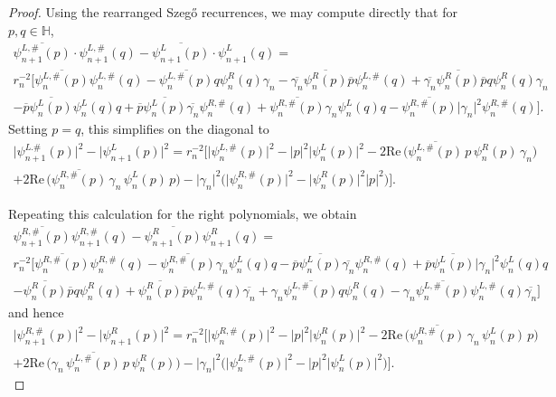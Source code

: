 \documentclass[11pt,reqno]{amsart}
\def\q{\psi}
\def\g{\gamma}
\def\HH{\mathbb{H}}
\theoremstyle{definition}
\numberwithin{equation}{section}
\renewcommand{\Re}{\mathrm{Re}\,}
\begin{document}
\begin{proof}
Using the rearranged Szeg\H{o} recurrences, we may compute directly that for \(p,q \in \HH\),
\begin{multline*}
    \overline{\q_{n+1}^{L,\#}(p)} \cdot \q_{n+1}^{L,\#}(q) - \overline{\q_{n+1}^L(p)} \cdot \q_{n+1}^L(q) = \\ r_n^{-2}\Bigg[\overline{\q_n^{L,\#}(p)} \q_n^{L,\#}(q) - \overline{\q_n^{L,\#}(p)} q \q_n^R(q) \g_n - \overline{\g_n} \overline{\q_n^R(p)} \overline{p} \q_n^{L,\#}(q) + \overline{\g_n} \overline{\q_n^R(p)} \overline{p}q \q_n^R(q) \g_n \\ - \overline{p} \overline{\q_n^L(p)} \q_n^L(q) q + \overline{p} \overline{\q_n^L(p)} \overline{\g_n} \q_n^{R,\#}(q) + \overline{\q_n^{R,\#}(p)} \g_n \q_n^L(q) q - \overline{\q_n^{R,\#}(p)} \lvert \g_n \rvert^2 \q_n^{R,\#}(q) \Bigg].
\end{multline*}
Setting \(p = q\), this simplifies on the diagonal to
\begin{multline*}
    \lvert \q_{n+1}^{L.\#}(p) \rvert^2 - \lvert \q_{n+1}^L(p) \rvert^2 = r_n^{-2} \Bigg[ \lvert \q_n^{L,\#}(p) \rvert^2 -  \lvert p \rvert^2 \lvert \q_n^L(p)\rvert^2 - 2\Re\Big(\overline{\q_n^{L,\#}(p)} \, p \, \q_n^R(p) \, \g_n\Big) \\ + 2\Re\Big( \overline{\q_n^{R,\#}(p)} \, \g_n \, \q_n^L(p) \, p \Big) - \lvert \g_n \rvert^2 \Big( \lvert \q_n^{R,\#}(p) \rvert^2 - \lvert \q_n^R(p) \rvert^2 \lvert p \rvert^2  \Big) \Bigg].
\end{multline*}

Repeating this calculation for the right polynomials, we obtain
\begin{multline*}
    \overline{\q_{n+1}^{R,\#}(p)} \q_{n+1}^{R,\#}(q) - \overline{\q_{n+1}^R(p)} \q_{n+1}^R(q) = \\ r_n^{-2}\Bigg[\overline{\q_n^{R,\#}(p)} \q_n^{R,\#}(q) - \overline{\q_n^{R,\#}(p)} \g_n \q_n^L(q)q - \overline{p} \overline{\q_n^L(p)} \overline{\g_n} \q_n^{R,\#}(q) + \overline{p} \overline{\q_n^L(p)} \lvert \g_n \rvert^2 \q_n^L(q) q \\ - \overline{\q_n^R(p)} \overline{p} q \q_n^R(q) + \overline{\q_n^R(p)} \overline{p} \q_n^{L,\#}(q) \overline{\g_n} + \g_n \overline{\q_n^{L,\#}(p)} q \q_n^R(q) - \g_n \overline{\q_n^{L,\#}(p)} \q_n^{L,\#}(q) \overline{\g_n} \Bigg]
\end{multline*}
and hence
\begin{multline*}
    \lvert \q_{n+1}^{R,\#}(p)\rvert^2 - \lvert \q_{n+1}^R(p) \rvert^2 = r_n^{-2}\Bigg[ \lvert \q_n^{R,\#}(p) \rvert^2 - \lvert p \rvert^2 \lvert \q_n^R(p) \rvert^2 - 2\Re\Big(\overline{\q_n^{R,\#}(p)} \, \g_n \, \q_n^L(p) \, p \Big) \\ + 2\Re\Big( \g_n \, \overline{\q_n^{L,\#}(p)} \, p \, \q_n^R(p)\Big) - \lvert \g_n \rvert^2 \Big(\lvert \q_n^{L,\#}(p) \rvert^2 - \lvert p \rvert^2 \lvert \q_n^L(p) \rvert^2 \Big) \Bigg].
\end{multline*}


\end{proof}
\end{document}
